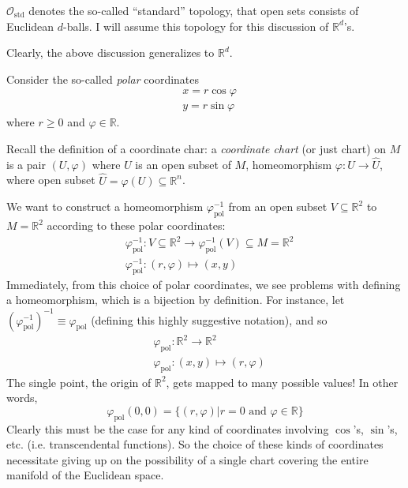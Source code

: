 $\mathcal{O}_{\text{std}}$ denotes the so-called ``standard'' topology, that open sets consists of Euclidean $d$-balls.  I will assume this topology for this discussion of $\mathbb{R}^d$'s.  

Clearly, the above discussion generalizes to $\mathbb{R}^d$.  

Consider the so-called \emph{polar} coordinates 
\begin{equation}\label{dgdt:Eq:R2polarcoordinates}
	\begin{aligned}
		& x = r\cos{\varphi} \\ 
		& y = r\sin{\varphi}
	\end{aligned}
\end{equation}
where $r\geq 0$ and $\varphi \in \mathbb{R}$.  

Recall the definition of a coordinate char: a \emph{coordinate chart} (or just chart) on $M$ is a pair $(U, \varphi)$ where $U$ is an open subset of $M$, homeomorphism $\varphi : U \to \widehat{U}$, where open subset $\widehat{U} = \varphi(U) \subseteq \mathbb{R}^n$.

We want to construct a homeomorphism $\varphi^{-1}_{\text{pol}}$ from an open subset $V \subseteq \mathbb{R}^2$ to $M = \mathbb{R}^2$ according to these polar coordinates:
\[
\begin{aligned}
	& \varphi_{\text{pol}}^{-1}: V \subseteq \mathbb{R}^2 \to \varphi_{\text{pol}}^{-1}(V) \subseteq M = \mathbb{R}^2 \\ 
	& \varphi^{-1}_{\text{pol}}:(r,\varphi) \mapsto (x,y)
\end{aligned}
\]
Immediately, from this choice of polar coordinates, we see problems with defining a homeomorphism, which is a bijection by definition.  For instance, let $(\varphi_{\text{pol}}^{-1})^{-1} \equiv \varphi_{\text{pol}}$ (defining this highly suggestive notation), and so 
\[
\begin{aligned}
	& \varphi_{\text{pol}}:\mathbb{R}^2 \to \mathbb{R}^2 \\ 
	& \varphi_{\text{pol}}:(x,y) \mapsto (r,\varphi)
\end{aligned}
\]
The single point, the origin of $\mathbb{R}^2$, gets mapped to many possible values! In other words,
\[
\varphi_{\text{pol}}(0,0) = \lbrace (r,\varphi) | r=0 \text{ and } \varphi \in \mathbb{R} \rbrace
\]
Clearly this must be the case for any kind of coordinates involving $\cos$'s, $\sin$'s, etc. (i.e. transcendental functions).  So the choice of these kinds of coordinates necessitate giving up on the possibility of a single chart covering the entire manifold of the Euclidean space.  

